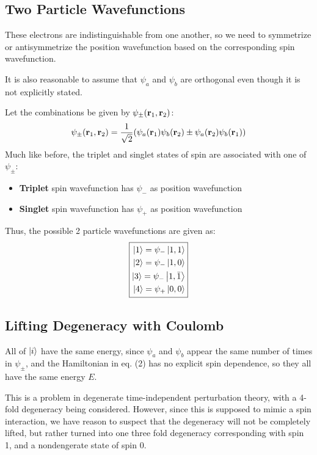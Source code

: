 \documentclass[12pt]{article}
\theoremstyle{plain}
\theoremstyle{definition}
\begin{document}
\subsection{Two Particle Wavefunctions}
These electrons are indistinguishable from one another, so we need to symmetrize or antisymmetrize the position wavefunction based on the corresponding spin wavefunction.

It is also reasonable to assume that $\psi_a$ and $\psi_b$ are orthogonal even though it is not explicitly stated.

Let the combinations be given by $\psi_\pm(\vb{r}_1,\vb{r}_2)$:
\begin{align*}
  \psi_\pm(\vb{r}_1,\vb{r}_2)=\frac1{\sqrt{2}}
  \qty(\psi_a(\vb{r}_1)\psi_b(\vb{r}_2)\pm\psi_a(\vb{r}_2)\psi_b(\vb{r}_1))
\end{align*}
Much like before, the triplet and singlet states of spin are associated with one of $\psi_\pm$:
\begin{itemize}
\item \textbf{Triplet} spin wavefunction has
  $\psi_-$ as position wavefunction
\item \textbf{Singlet} spin wavefunction has
  $\psi_+$ as position wavefunction
\end{itemize}
Thus, the possible 2 particle wavefunctions are given as:
\begin{equation}
\boxed{  \begin{aligned}
    \ket{1}=\psi_-\ket{1,1}\\
    \ket{2}=\psi_-\ket{1,0}\\
    \ket{3}=\psi_-\ket{1,\bar{1}}\\
    \ket{4}=\psi_+\ket{0,0}
  \end{aligned}}
\end{equation}
\subsection{Lifting Degeneracy with Coulomb}
All of $\ket{i}$ have the same energy, since $\psi_a$ and $\psi_b$ appear the same number of times in $\psi_\pm$, and the Hamiltonian in eq. (2) has no explicit spin dependence, so they all have the same energy $E$.

This is a problem in degenerate time-independent perturbation theory, with a 4-fold degeneracy being considered. However, since this is supposed to mimic a spin interaction, we have reason to suspect that the degeneracy will not be completely lifted, but rather turned into one three fold degeneracy corresponding with spin 1, and a nondengerate state of spin 0.
\end{document}
